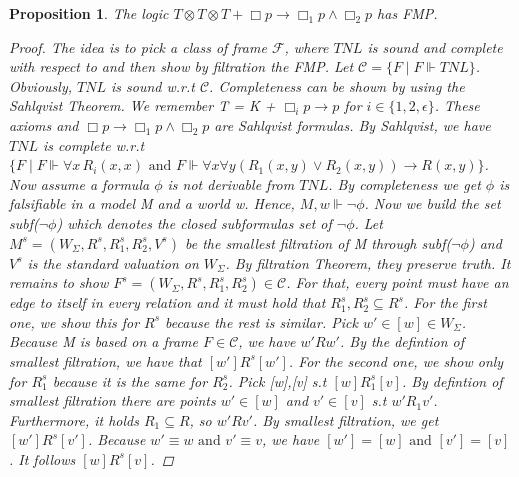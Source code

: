 \documentclass[12pt, a4paper]{scrartcl}
\newtheorem{proposition}[definition]{Proposition}
\begin{document}
\begin{proposition}
    The logic $T \otimes T \otimes T + \Box p \rightarrow \Box_1 p \land \Box_2 p$ has FMP.
    \begin{proof}
    The idea is to pick a class of frame $\mathcal{F}$, where $\mathit{TNL}$ is sound and complete with respect to and then show by filtration the FMP. \newline \newline
    Let $\mathcal{C} = \{F \mid F \Vdash \mathit{TNL}\}$. Obviously,  $\mathit{TNL}$ is sound w.r.t $\mathcal{C}$. Completeness can be shown by using the Sahlqvist Theorem.
    We remember T = K + $\Box_i p \rightarrow p$ for $i \in \{1,2, \epsilon\}$. These axioms and $\Box p \rightarrow \Box_1 p \land \Box_2 p$ are Sahlqvist formulas. 
    By Sahlqvist, we have $\mathit{TNL}$ is complete w.r.t $\{F \mid F \Vdash \forall x \, R_i(x,x) \mbox{ and } F \Vdash \forall x \forall y (R_1(x,y) \lor R_2(x,y)) \rightarrow R(x,y)\}$. \newline \newline
    Now assume a formula $\phi$ is not derivable from $\mathit{TNL}$. By completeness we get $\phi$ is falsifiable in a model M and a world w. Hence, $M,w \Vdash \neg \phi$. Now we build the set subf($\neg \phi$) which denotes the closed subformulas set of $\neg \phi$.
    Let $M^s = (W_\Sigma, R^s, R^s_1, R^s_2, V^s)$ be the smallest filtration of M through subf($\neg \phi$) and $V^s$ is the standard valuation on $W_\Sigma$. By filtration Theorem, they preserve truth.
    It remains to show $F^s = (W_\Sigma, R^s, R^s_1, R^s_2)\in  \mathcal{C}$. For that, every point must have an edge to itself in every relation and it must hold that $R^s_1,R^s_2 \subseteq R^s$. For the first one, we show this for $R^s$ because the rest is similar.
    Pick $w' \in [w]\in W_\Sigma$. Because M is based on a frame $F \in \mathcal{C}$, we have $w'Rw'$. By the defintion of smallest filtration, we have that $[w']R^s[w']$. For the second one, we show only for $R^s_1$ because it is the same for $R^s_2$.
    Pick [w],[v] s.t $[w]R^s_1[v]$. By defintion of smallest filtration there are points $w' \in [w]$ and $v' \in [v]$ s.t $w'R_1v'$. Furthermore, it holds $R_1 \subseteq R$, so $w'Rv'$.
    By smallest filtration, we get $[w']R^s[v']$. Because $w' \equiv w \mbox{ and } v' \equiv v$, we have $[w'] = [w] \mbox{ and } [v'] = [v]$. It follows $[w]R^s[v]$.
    
    \end{proof}
        
\end{proposition}
\end{document}
